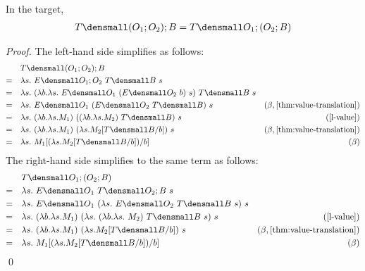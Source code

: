 \begin{lemma}
  \label{thm:templ-compose-assoc}
  In the target,
  \begin{align*}
    T\den{(O_1;O_2);B} = T\den{O_1;(O_2;B)}
  \end{align*}
\end{lemma}
\begin{proof}
  The left-hand side simplifies as follows:
  \begin{align*}
    &\quad T\den{(O_1;O_2);B} \\
    =& \quad \lambda s.~ E\den{O_1;O_2} ~T\den{B} ~s \\
    =& \quad \lambda s.~ (\lambda b. \lambda s.~ E\den{O_1} ~(E\den{O_2} ~b) ~s) ~T\den{B} ~s \\
    =& \quad \lambda s.~ E\den{O_1} ~(E\den{O_2} ~T\den{B}) ~s & (\beta, \cref{thm:value-translation}) \\
    =& \quad \lambda s.~ (\lambda b.\lambda s. M_1) ~((\lambda b. \lambda s. M_2) ~T\den{B}) ~s & (\cref{l-value}) \\
    =& \quad \lambda s.~ (\lambda b.\lambda s. M_1) ~(\lambda s. M_2\subst{b}{T\den{B}}) ~s & (\beta, \cref{thm:value-translation}) \\
    =& \quad \lambda s.~ M_1\subst{b}{(\lambda s. M_2\subst{b}{T\den{B}})} & (\beta) \\
  \end{align*}
  The right-hand side simplifies to the same term as follows:
  \begin{align*}
    &\quad T\den{O_1;(O_2;B)} \\
    =& \quad \lambda s.~ E\den{O_1} ~T\den{O_2;B} ~s \\
    =& \quad \lambda s.~ E\den{O_1} ~(\lambda s. ~E\den{O_2} ~T\den{B} ~s) ~s \\
    =& \quad \lambda s.~ (\lambda b. \lambda s. M_1) ~(\lambda s. ~(\lambda b. \lambda s.~ M_2) ~T\den{B} ~s) ~s & (\cref{l-value}) \\
    =& \quad \lambda s.~ (\lambda b. \lambda s. M_1) ~(\lambda s. M_2\subst{b}{T\den{B}}) ~s & (\beta, \cref{thm:value-translation}) \\
    =& \quad \lambda s.~ M_1\subst{b}{(\lambda s. M_2\subst{b}{T\den{B}})} & (\beta) \\
  \end{align*}
  \qed
\end{proof}


